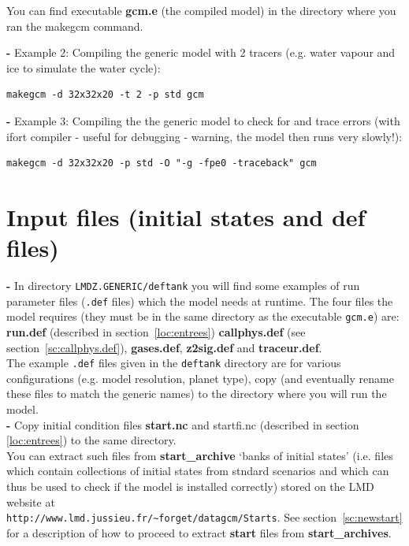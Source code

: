 \noindent
You can find executable {\bf gcm.e} (the compiled model) in the directory
where you ran the makegcm command.

{\bf -} Example 2: Compiling the generic model with 2 tracers
(e.g. water vapour and ice to simulate the water cycle):
\begin{verbatim}
makegcm -d 32x32x20 -t 2 -p std gcm
\end{verbatim}

{\bf -} Example 3:
Compiling the the generic model to check for and trace errors (with ifort compiler -
useful for debugging - warning, the model then runs very slowly!):
\begin{verbatim}
makegcm -d 32x32x20 -p std -O "-g -fpe0 -traceback" gcm
\end{verbatim}

\section{Input files (initial states and def files)}
{\bf -} In directory \verb+LMDZ.GENERIC/deftank+
you will find some examples of run
parameter files ({\tt .def} files) which the model needs at runtime.
The four files the model requires (they must be in the same directory as the
executable {\tt gcm.e}) are:
{\bf run.def} (described in
section~\ref{loc:entrees}) {\bf callphys.def}
(see section~\ref{sc:callphys.def}),
{\bf gases.def}, {\bf z2sig.def} and {\bf traceur.def}.\\

The example {\tt .def} files given in the {\tt deftank} directory
are for various configurations (e.g. model resolution, planet type), copy (and eventually
rename these files to match the generic names) to the directory where
you will run the model.\\

\noindent
{\bf -} Copy initial condition files
{\bf start.nc} and {startfi.nc}  (described in section
\ref{loc:entrees}) to the same directory.\\
You can extract such files from {\bf start\_archive}
`banks of initial states' (i.e. files which
contain collections of initial states from
stndard scenarios and which can thus be used
to check if the model is installed correctly) stored on the LMD website at\\
\verb+http://www.lmd.jussieu.fr/~forget/datagcm/Starts+.
See section~\ref{sc:newstart} for a description of how to proceed to
extract {\bf start} files from {\bf start\_archives}.\\

